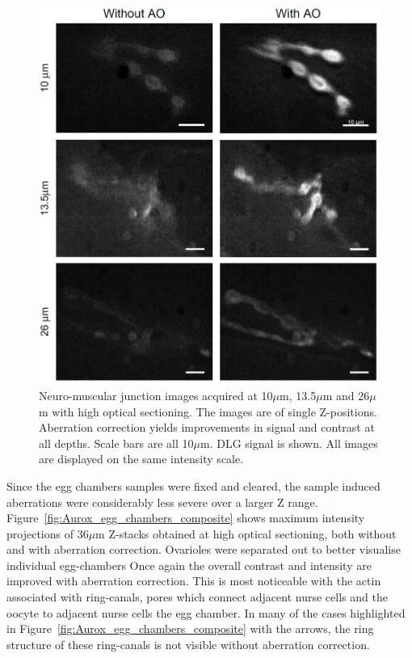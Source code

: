 \begin{figure}[h]
	\centering
	\includegraphics[width=\textwidth]{images/Aurox_depth_comparison_composite.jpg}
	\caption[Depth comparison of the Aurox imaging system]{Neuro-muscular 
		junction images acquired at 10$\mu$m, 13.5$\mu$m and 26$\mu$m with 
		high optical sectioning. The images are of single Z-positions. 
		Aberration correction yields improvements in signal and contrast 
		at all depths. Scale bars are all 10$\mu$m. DLG signal is shown. 
		All images are displayed on the same intensity scale.}
	\label{fig:Aurox_depth_comparison_composite}
\end{figure}

Since the egg chambers samples were fixed and cleared, the sample induced 
aberrations were considerably less severe over a larger Z range. 
Figure~\ref{fig:Aurox_egg_chambers_composite} shows maximum intensity 
projections of 36$\mu$m Z-stacks obtained at high optical sectioning, both
without and with aberration correction. Ovarioles were separated out to 
better visualise individual egg-chambers Once again the overall contrast 
and intensity are improved with aberration correction. This is most 
noticeable with the actin associated with ring-canals, pores which connect 
adjacent nurse cells and the oocyte to adjacent nurse cells the egg chamber.
In many of the cases highlighted in Figure~\ref{fig:Aurox_egg_chambers_composite}
with the arrows, the ring structure of these ring-canals is not visible
without aberration correction.

